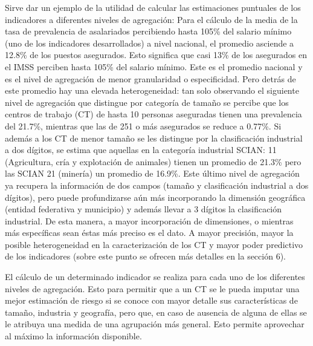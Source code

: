 \documentclass[
]{article}
\begin{document}
\begin{rmdcomment}
Sirve dar un ejemplo de la utilidad de calcular las estimaciones
puntuales de los indicadores a diferentes niveles de agregación: Para el
cálculo de la media de la tasa de prevalencia de asalariados percibiendo
hasta 105\% del salario mínimo (uno de los indicadores desarrollados) a
nivel nacional, el promedio asciende a 12.8\% de los puestos asegurados.
Esto significa que casi 13\% de los asegurados en el IMSS perciben hasta
105\% del salario mínimo. Este es el promedio nacional y es el nivel de
agregación de menor granularidad o especificidad. Pero detrás de este
promedio hay una elevada heterogeneidad: tan solo observando el
siguiente nivel de agregación que distingue por categoría de tamaño se
percibe que los centros de trabajo (CT) de hasta 10 personas aseguradas
tienen una prevalencia del 21.7\%, mientras que las de 251 o más
asegurados se reduce a 0.77\%. Si además a los CT de menor tamaño se les
distingue por la clasificación industrial a dos dígitos, se estima que
aquellas en la categoría industrial SCIAN: 11 (Agricultura, cría y
explotación de animales) tienen un promedio de 21.3\% pero las SCIAN 21
(minería) un promedio de 16.9\%. Este último nivel de agregación ya
recupera la información de dos campos (tamaño y clasificación industrial
a dos dígitos), pero puede profundizarse aún más incorporando la
dimensión geográfica (entidad federativa y municipio) y además llevar a
3 dígitos la clasificación industrial. De esta manera, a mayor
incorporación de dimensiones, o mientras más específicas sean éstas más
preciso es el dato. A mayor precisión, mayor la posible heterogeneidad
en la caracterización de los CT y mayor poder predictivo de los
indicadores (sobre este punto se ofrecen más detalles en la sección 6).
\end{rmdcomment}

El cálculo de un determinado indicador se realiza para cada uno de los diferentes niveles de agregación. Esto para permitir que a un CT se le pueda imputar una mejor estimación de riesgo si se conoce con mayor detalle sus características de tamaño, industria y geografía, pero que, en caso de ausencia de alguna de ellas se le atribuya una medida de una agrupación más general. Esto permite aprovechar al máximo la información disponible.
\end{document}
